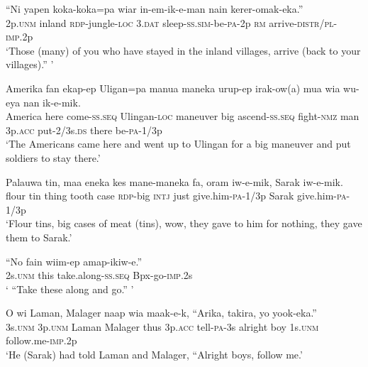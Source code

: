 \ea
\gll  “Ni  yapen  koka-koka=pa  wiar  in-em-ik-e-man          nain  kerer-omak-eka.” \\
2p.\textsc{unm}  inland  \textsc{rdp}-jungle-\textsc{loc}  3.\textsc{dat}  sleep-\textsc{ss}.\textsc{sim}-be-\textsc{pa}-2p  \textsc{rm}  arrive-\textsc{distr}/\textsc{pl}-\textsc{imp}.2p \\


\glt ‘Those (many) of you who have stayed in the inland villages, arrive (back to your villages).” ’ \\
\z


\ea
\gll  Amerika  fan  ekap-ep  Uligan=pa  manua  maneka   urup-ep  irak-ow(a)  mua  wia  wu-eya  nan                   ik-e-mik. \\
America  here  come-\textsc{ss.seq}  Ulingan-\textsc{loc}  maneuver  big  ascend-\textsc{ss.seq}  fight-\textsc{nmz}  man  3p.\textsc{acc}  put-2/3s.\textsc{ds}  there    be-\textsc{pa}-1/3p \\




\glt ‘The Americans came here and went up to Ulingan for a big maneuver and put soldiers to stay there.’ \\
\z


\ea
\gll  Palauwa  tin,  maa  eneka  kes  mane-maneka  fa,     oram  iw-e-mik,  Sarak  iw-e-mik. \\
flour  tin  thing  tooth  case  \textsc{rdp}-big  \textsc{intj}              just  give.him-\textsc{pa}-1/3p  Sarak  give.him-\textsc{pa}-1/3p \\


\glt ‘Flour tins, big cases of meat (tins), wow, they gave to him for nothing, they gave them to Sarak.’ \\
\z


\ea
\gll  “No  fain  wiim-ep  amap-ikiw-e.” \\
2s.\textsc{unm}  this  take.along-\textsc{ss.seq}  Bpx-go-\textsc{imp}.2s \\
\glt ‘ “Take these along and go.” ’ \\
\z


\ea
\gll  O  wi  Laman,  Malager  naap  wia  maak-e-k,        “Arika,  takira,  yo  yook-eka.” \\
3s.\textsc{unm}  3p.\textsc{unm}  Laman  Malager  thus  3p.\textsc{acc}  tell-\textsc{pa}-3s  alright  boy  1s.\textsc{unm}  follow.me-\textsc{imp}.2p \\


\glt ‘He (Sarak) had told Laman and Malager, “Alright boys, follow me.’ \\
\z


